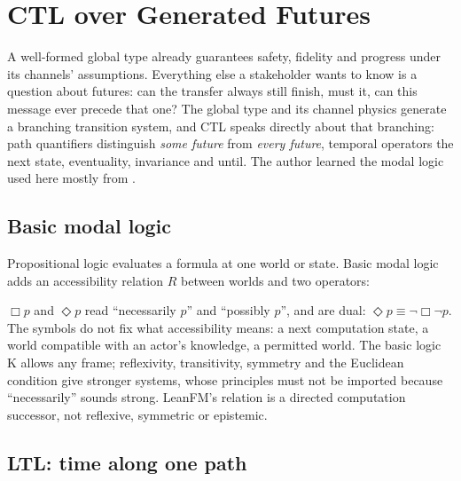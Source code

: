\chapter{CTL over Generated Futures}
\label{ch:ctl}

A well-formed global type already guarantees safety, fidelity and progress under
its channels' assumptions. Everything else a stakeholder wants to know is a
question about futures: can the transfer always still finish, must it, can this
message ever precede that one? The global type and its channel physics generate a
branching transition system, and CTL speaks directly about that branching: path
quantifiers distinguish \emph{some future} from \emph{every future}, temporal
operators the next state, eventuality, invariance and until. The author learned
the modal logic used here mostly from \citet{kroger2008temporal}.

\section{Basic modal logic}

Propositional logic evaluates a formula at one world or state. Basic modal logic
adds an accessibility relation $R$ between worlds and two operators:


$\Box p$ and $\Diamond p$ read ``necessarily $p$'' and ``possibly $p$'', and are
dual: $\Diamond p \equiv \neg\Box\neg p$. The symbols do not fix what accessibility
means: a next computation state, a world compatible with an actor's knowledge, a
permitted world. The basic logic K allows any frame; reflexivity, transitivity,
symmetry and the Euclidean condition give stronger systems, whose principles must
not be imported because ``necessarily'' sounds strong. LeanFM's relation is a
directed computation successor, not reflexive, symmetric or epistemic.

\section{LTL: time along one path}

